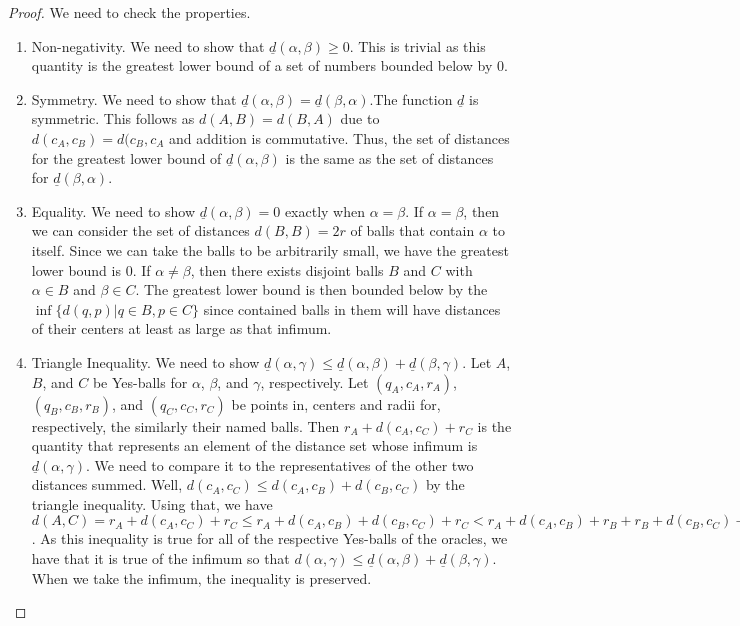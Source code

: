 \documentclass[12pt]{article}
\begin{document}
\begin{proof}
We need to check the properties. 
\begin{enumerate}
\item Non-negativity. We need to show that $\underline{d}(\alpha, \beta) \geq 0$. This is trivial as this quantity is the greatest lower bound of a set of numbers bounded below by 0. 
\item Symmetry. We need to show that $\underline{d}(\alpha,\beta) = \underline{d}(\beta,\alpha)$.The function $\underline{d}$ is symmetric. This follows as $d(A,B) = d(B,A)$ due to $d(c_A, c_B) = d(c_B, c_A$ and addition is commutative. Thus, the set of distances for the greatest lower bound of $\underline{d}(\alpha,\beta)$ is the same as the set of distances for $\underline{d}(\beta,\alpha)$.
\item Equality. We need to show $\underline{d}(\alpha,\beta) = 0$ exactly when $\alpha=\beta$. If $\alpha=\beta$, then we can consider the set of distances $d(B,B)= 2r$ of balls that contain $\alpha$ to itself. Since we can take the balls to be arbitrarily small, we have the greatest lower bound is 0. If $\alpha \neq \beta$, then there exists disjoint balls $B$ and $C$ with $\alpha \in B$ and $\beta \in C$. The greatest lower bound is then bounded below by the $\inf\{d(q,p) | q \in B, p \in C\}$ since contained balls in them will have distances of their centers at least as large as that infimum. 
\item Triangle Inequality. We need to show $\underline{d}(\alpha,\gamma) \leq \underline{d}(\alpha,\beta) + \underline{d}(\beta,\gamma)$. Let $A$, $B$, and $C$ be Yes-balls for $\alpha$, $\beta$, and $\gamma$, respectively. Let $(q_A,c_A, r_A)$, $(q_B,c_B, r_B)$, and $(q_C,c_C, r_C)$ be points in, centers and radii for, respectively, the similarly their named balls. Then $r_A + d(c_A, c_C) + r_C$ is the quantity that represents an element of the distance set whose infimum is $\underline{d}(\alpha,\gamma)$. We need to compare it to the representatives of the other two distances summed. Well, $d(c_A,c_C) \leq d(c_A,c_B) + d(c_B, c_C)$ by the triangle inequality. Using that, we have  $d(A, C) = r_A + d(c_A, c_C) + r_C \leq r_A +  d(c_A,c_B) + d(c_B, c_C) + r_C <  r_A +  d(c_A,c_B) + r_B + r_B + d(c_B, c_C) + r_ C = d(A,B) + d(B, C)$. As this inequality is true for all of the respective Yes-balls of the oracles, we have that it is true of the infimum so that $d(\alpha, \gamma) \leq \underline{d}(\alpha,\beta) + \underline{d}(\beta,\gamma)$. When we take the infimum, the inequality is preserved. 
\end{enumerate}
\end{proof}
\end{document}
